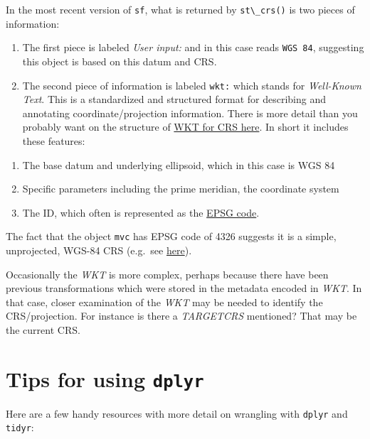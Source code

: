 \documentclass[
]{book}
\newcommand{\passthrough}[1]{#1}
\providecommand{\tightlist}{%
  \setlength{\itemsep}{0pt}\setlength{\parskip}{0pt}}
\begin{document}
In the most recent version of \passthrough{\lstinline!sf!}, what is returned by \passthrough{\lstinline!st\_crs()!} is two pieces of information:

\begin{enumerate}
\def\labelenumi{\arabic{enumi}.}
\tightlist
\item
  The first piece is labeled \emph{User input:} and in this case reads \passthrough{\lstinline!WGS 84!}, suggesting this object is based on this datum and CRS.
\item
  The second piece of information is labeled \passthrough{\lstinline!wkt:!} which stands for \emph{Well-Known Text}. This is a standardized and structured format for describing and annotating coordinate/projection information. There is more detail than you probably want on the structure of \href{http://docs.opengeospatial.org/is/12-063r5/12-063r5.html\#43}{WKT for CRS here}. In short it includes these features:
\end{enumerate}

\begin{enumerate}
\def\labelenumi{\alph{enumi}.}
\tightlist
\item
  The base datum and underlying ellipsoid, which in this case is WGS 84
\item
  Specific parameters including the prime meridian, the coordinate system
\item
  The ID, which often is represented as the \href{https://epsg.io/}{EPSG code}.
\end{enumerate}

The fact that the object \passthrough{\lstinline!mvc!} has EPSG code of 4326 suggests it is a simple, unprojected, WGS-84 CRS (e.g.~see \href{https://epsg.io/?q=4326}{here}).

Occasionally the \emph{WKT} is more complex, perhaps because there have been previous transformations which were stored in the metadata encoded in \emph{WKT}. In that case, closer examination of the \emph{WKT} may be needed to identify the CRS/projection. For instance is there a \emph{TARGETCRS} mentioned? That may be the current CRS.

\hypertarget{dplyr}{%
\chapter{\texorpdfstring{Tips for using \texttt{dplyr}}{Tips for using dplyr}}\label{dplyr}}

Here are a few handy resources with more detail on wrangling with \passthrough{\lstinline!dplyr!} and \passthrough{\lstinline!tidyr!}:
\end{document}
